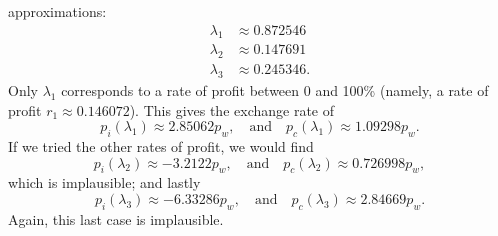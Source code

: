   approximations:
  \begin{subequations}
    \begin{align}
      \lambda_{1} &\approx0.872546\\
      \lambda_{2} &\approx0.147691\\
      \lambda_{3} &\approx0.245346.
    \end{align}
  \end{subequations}
  Only $\lambda_{1}$ corresponds to a rate of profit between 0 and 100\%
  (namely, a rate of profit $r_{1}\approx0.146072$). This gives the
  exchange rate of
  \begin{equation}
p_{i}(\lambda_{1})\approx2.85062p_{w},\quad\mbox{and}\quad
p_{c}(\lambda_{1})\approx1.09298p_{w}.
  \end{equation}
If we tried the other rates of profit, we would find 
  \begin{equation}
    p_{i}(\lambda_{2})\approx-3.2122p_{w},\quad\mbox{and}\quad
    p_{c}(\lambda_{2})\approx0.726998p_{w},
  \end{equation}
  which is implausible; and lastly
  \begin{equation}
    p_{i}(\lambda_{3})\approx-6.33286p_{w},\quad\mbox{and}\quad
    p_{c}(\lambda_{3})\approx2.84669p_{w}.
  \end{equation}
  Again, this last case is implausible.


